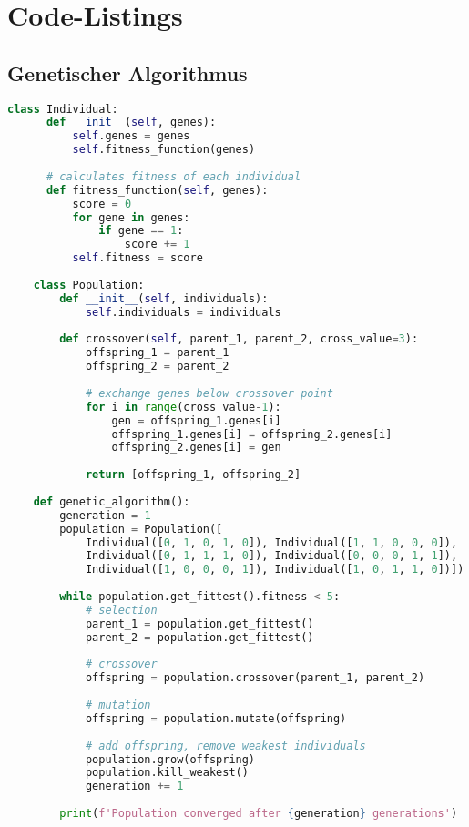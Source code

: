 \chapter{Code-Listings}

\section{Genetischer Algorithmus}

\begin{lstlisting}[language=Python, caption=Genetischer Algorithmus (Python)]
    class Individual:
      def __init__(self, genes):
          self.genes = genes
          self.fitness_function(genes)
      
      # calculates fitness of each individual
      def fitness_function(self, genes):
          score = 0
          for gene in genes:
              if gene == 1:
                  score += 1
          self.fitness = score
    
    class Population:
        def __init__(self, individuals):
            self.individuals = individuals
        
        def crossover(self, parent_1, parent_2, cross_value=3):
            offspring_1 = parent_1
            offspring_2 = parent_2
            
            # exchange genes below crossover point
            for i in range(cross_value-1):
                gen = offspring_1.genes[i]
                offspring_1.genes[i] = offspring_2.genes[i]
                offspring_2.genes[i] = gen
            
            return [offspring_1, offspring_2]
    
    def genetic_algorithm():
        generation = 1
        population = Population([
            Individual([0, 1, 0, 1, 0]), Individual([1, 1, 0, 0, 0]),
            Individual([0, 1, 1, 1, 0]), Individual([0, 0, 0, 1, 1]),
            Individual([1, 0, 0, 0, 1]), Individual([1, 0, 1, 1, 0])])
    
        while population.get_fittest().fitness < 5:
            # selection
            parent_1 = population.get_fittest()
            parent_2 = population.get_fittest()
    
            # crossover
            offspring = population.crossover(parent_1, parent_2)
    
            # mutation
            offspring = population.mutate(offspring)
    
            # add offspring, remove weakest individuals
            population.grow(offspring)
            population.kill_weakest()
            generation += 1
    
        print(f'Population converged after {generation} generations')
\end{lstlisting}

